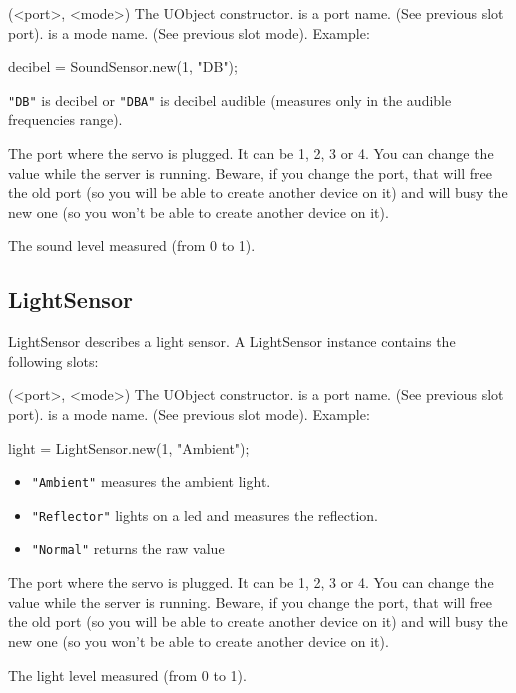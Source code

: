 \begin{urbiscriptapi}
\item[init](<port>, <mode>) The UObject constructor.  is a port
  name. (See previous slot port).  is a mode name. (See
  previous slot mode). Example:
\begin{urbiunchecked}
decibel = SoundSensor.new(1, "DB");
\end{urbiunchecked}


\item[mode] \lstinline{"DB"} is decibel or \lstinline{"DBA"} is decibel
  audible (measures only in the audible frequencies range).


\item[port] The port where the servo is plugged. It can be 1, 2, 3 or 4. You
  can change the value while the server is running. Beware, if you change
  the port, that will free the old port (so you will be able to create
  another device on it) and will busy the new one (so you won't be able to
  create another device on it).


\item[val] The sound level measured (from 0 to 1).
\end{urbiscriptapi}

\subsection{LightSensor}
LightSensor describes a light sensor. A LightSensor instance contains the
following slots:

\begin{urbiscriptapi}
\item[init](<port>, <mode>) The UObject constructor.  is a port
  name. (See previous slot port).  is a mode name. (See previous
  slot mode). Example:
\begin{urbiunchecked}
light = LightSensor.new(1, "Ambient");
\end{urbiunchecked}


\item[mode]
  \begin{itemize}
  \item \lstinline{"Ambient"} measures the ambient light.
  \item \lstinline{"Reflector"} lights on a led and measures the reflection.
  \item \lstinline{"Normal"} returns the raw value
  \end{itemize}


\item[port] The port where the servo is plugged. It can be 1, 2, 3 or 4. You
  can change the value while the server is running. Beware, if you change
  the port, that will free the old port (so you will be able to create
  another device on it) and will busy the new one (so you won't be able to
  create another device on it).


\item[val] The light level measured (from 0 to 1).
\end{urbiscriptapi}

